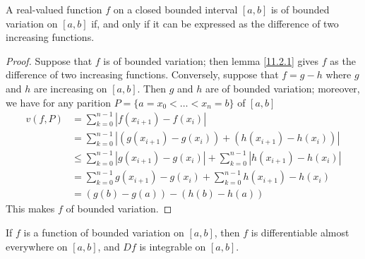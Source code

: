 \begin{theorem}\label{11.2.2}
    A real-valued function $f$ on a closed bounded interval  $[a,b]$ is of
    bounded variation on $[a,b]$ if, and only if it can be expressed as the
    difference of two increasing functions.
\end{theorem}
\begin{proof}
    Suppose that $f$ is of bounded variation; then lemma \ref{11.2.1} gives $f$
    as the difference of two increasing functions. Conversely, suppose that
    $f=g-h$ where  $g$ and  $h$ are increasing on  $[a,b]$. Then $g$ and  $h$
    are of bounded variation; moreover, we have for any parition
    $P=\{a=x_0<\dots<x_n=b\}$ of $[a,b]$
    \begin{align*}
        v(f,P)  &=  \sum_{k=0}^{n-1}{|f(x_{i+1})-f(x_i)|}   \\
                &=  \sum_{k=0}^{n-1}{|(g(x_{i+1})-g(x_i))+(h(x_{i+1})-h(x_i))|} \\
                &\leq \sum_{k=0}^{n-1}{|g(x_{i+1})-g(x_i)|}+
                    \sum_{k=0}^{n-1}{|h(x_{i+1})-h(x_i)|} \\
                &= \sum_{k=0}^{n-1}{g(x_{i+1})-g(x_i)}+
                    \sum_{k=0}^{n-1}{h(x_{i+1})-h(x_i)} \\
                &= (g(b)-g(a))-(h(b)-h(a))
    \end{align*}
    This makes $f$ of bounded variation.
\end{proof}
\begin{corollary}
    If $f$ is a function of bounded variation on $[a,b]$, then $f$ is
    differentiable almost everywhere on $[a,b]$, and $D{f}$ is integrable on
    $[a,b]$.
\end{corollary}
